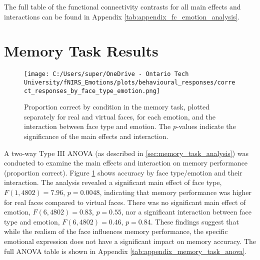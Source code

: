 The full table of the functional connectivity contrasts for all main effects and interactions can be found in Appendix \ref{tab:appendix_fc_emotion_analysis}.

\section{Memory Task Results}
\begin{figure}[H]
  \centering
  \texttt{[image: C:/Users/super/OneDrive - Ontario Tech University/fNIRS\_Emotions/plots/behavioural\_responses/correct\_responses\_by\_face\_type\_emotion.png]}
  \caption[Correct Memory Task Responses by Face Type and Emotion]{Proportion correct by condition in the memory task, plotted separately for real and virtual faces, for each emotion, and the interaction between face type and emotion. 
  The $p$-values indicate the significance of the main effects and interaction. }
  \label{fig:memory_task_results}
\end{figure}

A two-way Type III ANOVA (as described in \ref{sec:memory_task_analysis}) was conducted to examine the main effects and interaction on memory performance (proportion correct). 
Figure \ref{fig:memory_task_results} shows accuracy by face type/emotion and their interaction.
The analysis revealed a significant main effect of face type, $F(1,4802)=7.96$, $p=0.0048$, indicating that memory performance was higher for real faces compared to virtual faces. 
There was no significant main effect of emotion, $F(6,4802)=0.83$, $p=0.55$, nor a significant interaction between face type and emotion, $F(6,4802)=0.46$, $p=0.84$. 
These findings suggest that while the realism of the face influences memory performance, the specific emotional expression does not have a significant impact on memory accuracy.
The full ANOVA table is shown in Appendix \ref{tab:appendix_memory_task_anova}.